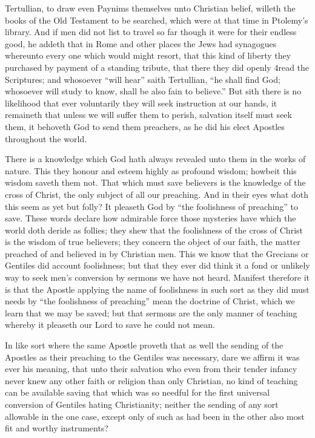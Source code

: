 Tertullian, to draw even Paynims themselves unto Christian belief, willeth the books of the Old Testament to be searched, which were at that time in Ptolemy’s library. And if men did not list to travel so far though it were for their endless good, he addeth that in Rome and other places the Jews had synagogues whereunto every one which would might resort, that this kind of liberty they purchased by payment of a standing tribute, that there they did openly 4read the Scriptures; and whosoever “will hear” saith Tertullian, “he shall find God; whosoever will study to  know, shall be also fain to believe.” But sith there is no likelihood that ever voluntarily they will seek instruction at our hands, it remaineth that unless we will suffer them to perish, salvation itself must seek them, it behoveth God to send them preachers, as he did his elect Apostles throughout the world.

There is a knowledge which God hath always revealed unto them in the works of nature. This they honour and esteem highly as profound wisdom; howbeit this wisdom saveth them not. That which must save believers is the knowledge of the cross of Christ, the only subject of all our preaching. And in their eyes what doth this seem as yet but folly? It pleaseth God by “the foolishness of preaching” to save. These words declare how admirable force those mysteries have which the world doth deride as follies; they shew that the foolishness of the cross of Christ is the wisdom of true believers; they concern the object of our faith, the matter preached of and believed in by Christian men. This we know that the Grecians or Gentiles did account foolishness; but that they ever did think it a fond or unlikely way to seek men’s conversion by sermons we have not heard. Manifest therefore it is that the Apostle applying the name of foolishness in such sort as they did must needs by “the foolishness of preaching” mean the doctrine of Christ, which we learn that we may be saved; but that sermons are the only manner of teaching whereby it pleaseth our Lord to save he could not mean.

In like sort where the same Apostle proveth that as well the sending of the Apostles as their preaching to the Gentiles was necessary, dare we affirm it was ever his meaning, that unto their salvation who even from their tender infancy never knew any other faith or religion than only Christian, no kind of teaching can be available saving that which was so needful for the first universal conversion of Gentiles hating Christianity; neither the sending of any sort allowable in the one case, except only of such as had been in the other also most fit and worthy instruments?

